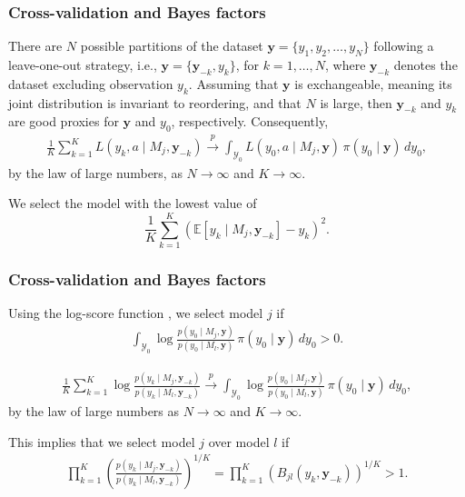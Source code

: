 \documentclass[12pt, compress]{beamer}
\begin{document}
\begin{frame}
	\frametitle{Cross-validation and Bayes factors}
There are \( N \) possible partitions of the dataset \( \mathbf{y} = \{y_1, y_2, \dots, y_N\} \) following a leave-one-out strategy, i.e., \( \mathbf{y} = \{\mathbf{y}_{-k}, y_k\} \), for \( k = 1, \dots, N \), where \( \mathbf{y}_{-k} \) denotes the dataset excluding observation \( y_k \). Assuming that \( \mathbf{y} \) is exchangeable, meaning its joint distribution is invariant to reordering, and that \( N \) is large, then \( \mathbf{y}_{-k} \) and \( y_k \) are good proxies for \( \mathbf{y} \) and \( y_0 \), respectively. Consequently,
\begin{align*}
	\frac{1}{K} \sum_{k=1}^K L(y_k, a \mid M_j, \mathbf{y}_{-k}) 
	\stackrel{p}{\rightarrow}\int_{\mathcal{Y}_0} L(y_0, a \mid M_j, \mathbf{y}) \, \pi(y_0 \mid \mathbf{y}) \, dy_0,
\end{align*}
by the law of large numbers, as \( N \to \infty \) and \( K \to \infty \).

We select the model with the lowest value of
\[
\frac{1}{K} \sum_{k=1}^K \left( \mathbb{E}[y_k \mid M_j, \mathbf{y}_{-k}] - y_k \right)^2.
\]

\end{frame}

\begin{frame}
	\frametitle{Cross-validation and Bayes factors}
Using the log-score function \cite{martin2022optimal}, we select model \( j \) if
\begin{align*}
	\int_{\mathcal{Y}_0} \log\frac{p(y_0 \mid M_j, \mathbf{y})}{p(y_0 \mid M_l, \mathbf{y})} \, \pi(y_0 \mid \mathbf{y}) \, dy_0 > 0.
\end{align*}

\begin{align*}
	\frac{1}{K}\sum_{k=1}^K\log\frac{p(y_k \mid M_j, \mathbf{y}_{-k})}{p(y_k \mid M_l, \mathbf{y}_{-k})} 
	\stackrel{p}{\rightarrow} \int_{\mathcal{Y}_0} \log\frac{p(y_0 \mid M_j, \mathbf{y})}{p(y_0 \mid M_l, \mathbf{y})} \, \pi(y_0 \mid \mathbf{y}) \, dy_0,
\end{align*}
by the law of large numbers as \( N \to \infty \) and \( K \to \infty \).

This implies that we select model \( j \) over model \( l \) if
\begin{align*}
	\prod_{k=1}^K \left( \frac{p(y_k \mid M_j, \mathbf{y}_{-k})}{p(y_k \mid M_l, \mathbf{y}_{-k})} \right)^{1/K} 
	= \prod_{k=1}^K \left( B_{jl}(y_k, \mathbf{y}_{-k}) \right)^{1/K} > 1.
\end{align*}
\end{frame}
\end{document}
